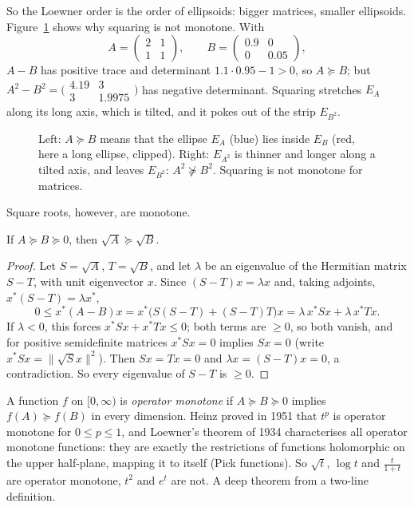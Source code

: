 So the Loewner order is the order of ellipsoids: bigger matrices, smaller ellipsoids. Figure~\ref{fig:loewner} shows why squaring is
not monotone. With
\[
A=\begin{pmatrix}2&1\\1&1\end{pmatrix},\qquad B=\begin{pmatrix}0.9&0\\0&0.05\end{pmatrix},
\]
$A-B$ has positive trace and determinant $1.1\cdot0.95-1>0$, so $A\succeq B$; but $A^2-B^2=\bigl(\begin{smallmatrix}4.19&3\\3&1.9975
\end{smallmatrix}\bigr)$ has negative determinant. Squaring stretches $E_A$ along its long axis, which is tilted, and it pokes out of
the strip $E_{B^2}$.

\begin{figure}[ht]
\centering
{}
\caption{Left: $A\succeq B$ means that the ellipse $E_A$ (blue) lies inside $E_B$ (red, here a long ellipse, clipped). Right:
$E_{A^2}$ is thinner and longer along a tilted axis, and leaves $E_{B^2}$: $A^2\not\succeq B^2$. Squaring is not monotone for matrices.}
\label{fig:loewner}
\end{figure}

Square roots, however, are monotone.

\begin{theorem}\label{thm:sqrtmonotone}
If $A\succeq B\succeq0$, then $\sqrt A\succeq\sqrt B$.
\end{theorem}
\begin{proof}
Let $S=\sqrt A$, $T=\sqrt B$, and let $\lambda$ be an eigenvalue of the Hermitian matrix $S-T$, with unit eigenvector $x$. Since
$(S-T)x=\lambda x$ and, taking adjoints, $x^*(S-T)=\lambda x^*$,
\[
0\le x^*(A-B)x=x^*\bigl(S(S-T)+(S-T)T\bigr)x=\lambda\,x^*Sx+\lambda\,x^*Tx.
\]
If $\lambda<0$, this forces $x^*Sx+x^*Tx\le0$; both terms are $\ge0$, so both vanish, and for positive semidefinite matrices
$x^*Sx=0$ implies $Sx=0$ (write $x^*Sx=\|\sqrt Sx\|^2$). Then $Sx=Tx=0$ and $\lambda x=(S-T)x=0$, a contradiction. So every eigenvalue
of $S-T$ is $\ge0$.
\end{proof}

\begin{remark}
A function $f$ on $[0,\infty)$ is \emph{operator monotone} if $A\succeq B\succeq0$ implies $f(A)\succeq f(B)$ in every dimension. Heinz
proved in 1951 that $t^p$ is operator monotone for $0\le p\le1$, and Loewner's theorem of 1934 characterises all operator monotone
functions: they are exactly the restrictions of functions holomorphic on the upper half-plane, mapping it to itself (Pick functions).
So $\sqrt t$, $\log t$ and $\frac t{1+t}$ are operator monotone, $t^2$ and $e^t$ are not. A deep theorem from a two-line definition.
\end{remark}

